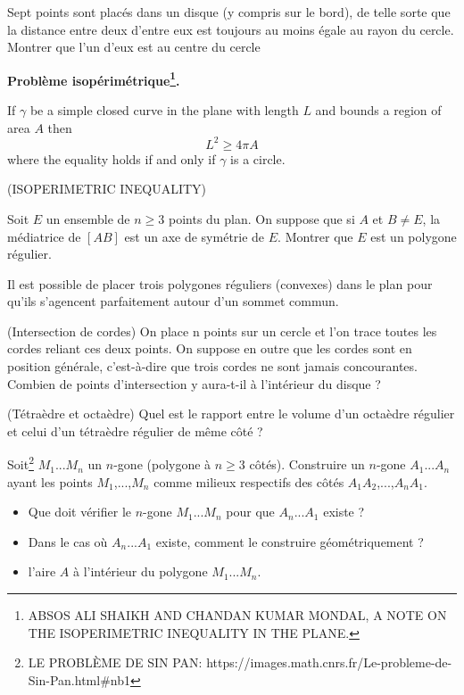 \begin{example}
Sept points sont placés dans un disque (y compris sur le bord), de telle sorte que la
distance entre deux d’entre eux est toujours au moins égale au rayon du cercle. Montrer que
l’un d’eux est au centre du cercle
\end{example}

\textbf{Problème isopérimétrique\footnote{ABSOS ALI SHAIKH AND CHANDAN KUMAR MONDAL, A NOTE ON THE ISOPERIMETRIC INEQUALITY IN THE PLANE.}.}
\\
\begin{theorem}
If $\gamma$ be a simple closed curve in the plane with length $L$ and bounds a region of area $A$ then
\[
L^{2} \geq 4 \pi A
\]
where the equality holds if and only if $\gamma$ is a circle.
\end{theorem}

\begin{example}{(ISOPERIMETRIC INEQUALITY)}
\end{example}

\begin{exercise}
Soit $E$ un ensemble de $n \geq 3$ points du plan. On suppose que si $A$ et $B \neq E$, la médiatrice
de $\left[AB\right]$ est un axe de symétrie de $E$. Montrer que $E$ est un polygone régulier.
\end{exercise}

\begin{exercise}
Il est possible de placer trois polygones réguliers (convexes) dans le plan pour qu'ils s'agencent parfaitement autour d'un sommet commun.
\end{exercise}

\begin{exercise}{(Intersection de cordes)}
On place n points sur un cercle et l'on trace toutes les cordes reliant ces deux points. On
suppose en outre que les cordes sont en position générale, c'est-à-dire que trois cordes ne
sont jamais concourantes. Combien de points d'intersection y aura-t-il à l'intérieur du disque ?
\end{exercise}

\begin{exercise}{(Tétraèdre et octaèdre)}
Quel est le rapport entre le volume d'un octaèdre régulier et celui d'un tétraèdre régulier de même côté ?
\end{exercise}
\begin{exercise}
Soit\footnote{LE PROBLÈME DE SIN PAN: https://images.math.cnrs.fr/Le-probleme-de-Sin-Pan.html\#nb1} $M_{1}$...$M_{n}$ un $n$-gone (polygone à $n\geq 3$ côtés). Construire un $n$-gone $A_{1}$...$A_{n}$ ayant les points $M_{1}$,...,$M_{n}$ comme milieux respectifs des côtés $A_{1}A_{2}$,...,$A_{n}A_{1}$.
 \begin{itemize}
   \item Que doit vérifier le $n$-gone $M_{1}$...$M_{n}$ pour que $A_{n}$...$A_{1}$ existe ?
   \item Dans le cas où $A_{n}$...$A_{1}$ existe, comment le construire géométriquement ?
   \item l'aire $A$ à l'intérieur du polygone $M_{1}$...$M_{n}$.
 \end{itemize}

\end{exercise}
